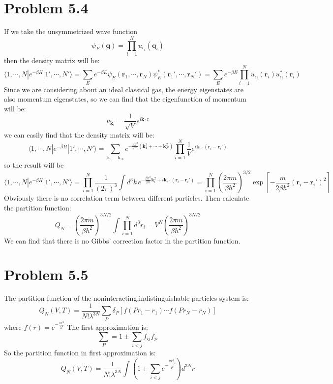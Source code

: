 \documentclass{article}
\begin{document}
\section*{Problem 5.4}
If we take the unsymmetrized wave function
$$
\psi_E(\mathbf{q}) = \prod_{i=1}^N u_{\epsilon_i}(\mathbf{q}_i)
$$
then the density matrix will be:
\begin{equation}
\langle 1,\cdots,N|e^{-\beta H}|1',\cdots,N'\rangle = \sum_{E}e^{-\beta E}\psi_E(\mathbf{r}_1,\cdots,\mathbf{r}_N)\psi^*_E(\mathbf{r}_1',\cdots,\mathbf{r}_N')=\sum_{E}e^{-\beta E}\prod_{i=1}^N u_{\epsilon_i}(\mathbf{r}_i)u^*_{\epsilon_i}(\mathbf{r}_i)
\end{equation}
Since we are considering about an ideal classical gas, the energy eigenstates are also momentum eigenstates, so we can find that the eigenfunction of momentum will be:
$$
u_{\mathbf{k}_i} = \frac{1}{\sqrt{V}}e^{i\mathbf{k}\cdot\mathrm{r}}
$$
we can easily find that the density matrix will be:
\begin{equation}
\langle 1,\cdots,N|e^{-\beta H}|1',\cdots,N'\rangle = \sum_{\mathbf{k}_1,\cdots \mathbf{k}_N}e^{-\frac{\beta \hbar^2}{2m}(\mathbf{k}^2_1+\cdots+\mathbf{k}_N^2)}\prod_{i=1}^N\frac{1}{V}e^{i\mathbf{k}_i\cdot(\mathbf{r}_i-\mathbf{r}_i')}
\end{equation}
so the result will be
\begin{equation}
\langle 1,\cdots,N|e^{-\beta H}|1',\cdots,N'\rangle = \prod_{i=1}^N\frac{1}{(2\pi)^3}\int d^3k \,e^{-\frac{\beta \hbar^2}{2m}\mathbf{k}_i^2+i\mathbf{k}_i\cdot(\mathbf{r}_i-\mathbf{r}_i')} = \prod_{i=1}^N\left(\frac{2\pi m}{\beta h^2}\right)^{3/2}\exp\left[-\frac{m}{2\beta\hbar^2}(\mathbf{r}_i-\mathbf{r}_i')^2\right]
\end{equation}
Obviously there is no correlation term between different particles. Then calculate the partition function:
\begin{equation}
Q_N = \left(\frac{2\pi m}{\beta h^2}\right)^{3N/2}\int \prod_{i=1}^N d^3r_i = V^N \left(\frac{2\pi m}{\beta h^2}\right)^{3N/2}
\end{equation}
We can find that there is no Gibbs’ correction factor in the partition function.


\section*{Problem 5.5} %
\label{sec:problem_5_5}
	
	The partition function of the noninteracting,indistinguishable particles system is:
	$$Q_N(V,T)=\frac{1}{N!\lambda^{3N}}\sum_P \delta_P[f(Pr_1-r_1)\cdots f(Pr_N-r_N)]$$
	where $f(r)=e^{-\frac{\pi r^2}{\lambda^2}}$
	The first approximation is:
	$$\sum_P=1\pm\sum_{i<j}f_{ij}f_{ji}$$
	So the partition function in first approximation is:
	$$Q_N(V,T)=\frac{1}{N!\lambda^{3N}}\int(1\pm\sum_{i<j}e^{-\frac{\pi r_{ij}^2}{\lambda^2}})d^{3N}r$$
\end{document}
